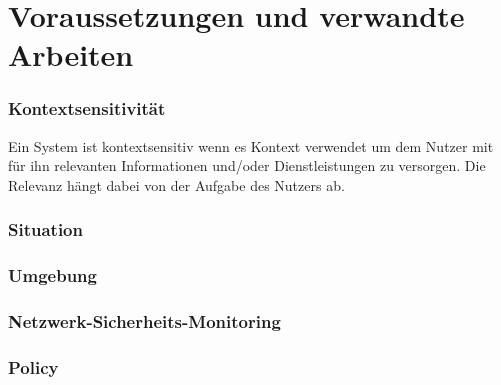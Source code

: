 \chapter{Voraussetzungen und verwandte Arbeiten}
\label{cha:requirements_and_related_work}




\subsection{Kontextsensitivität}

Ein System ist kontextsensitiv wenn es Kontext verwendet um dem Nutzer mit für ihn relevanten Informationen und/oder Dienstleistungen zu versorgen. Die Relevanz hängt dabei von der Aufgabe des Nutzers ab.
\subsection{Situation}
\subsection{Umgebung}

\subsection{Netzwerk-Sicherheits-Monitoring}
\subsection{Policy}

